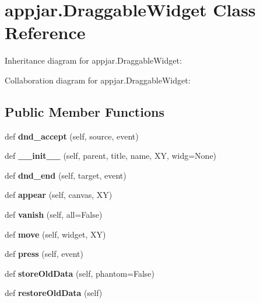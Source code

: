 \hypertarget{classappjar_1_1_draggable_widget}{}\section{appjar.\+Draggable\+Widget Class Reference}
\label{classappjar_1_1_draggable_widget}


Inheritance diagram for appjar.\+Draggable\+Widget\+:


Collaboration diagram for appjar.\+Draggable\+Widget\+:
\subsection*{Public Member Functions}
\begin{DoxyCompactItemize}
\item 
\mbox{\label{classappjar_1_1_draggable_widget_a07c4295f08ad9fbfcecf73a1ef39d99f}} 
def {\bfseries dnd\+\_\+accept} (self, source, event)
\item 
\mbox{\label{classappjar_1_1_draggable_widget_abc8b85a44fb6890ae6ef002eb5480371}} 
def {\bfseries \+\_\+\+\_\+init\+\_\+\+\_\+} (self, parent, title, name, XY, widg=None)
\item 
\mbox{\label{classappjar_1_1_draggable_widget_ae9601af290ccd53679f5f451948b68f1}} 
def {\bfseries dnd\+\_\+end} (self, target, event)
\item 
\mbox{\label{classappjar_1_1_draggable_widget_a1f780bb2acfe3a9c627e4f23e3e63f8d}} 
def {\bfseries appear} (self, canvas, XY)
\item 
\mbox{\label{classappjar_1_1_draggable_widget_abc06632116afbf79ac31a115f1d5090e}} 
def {\bfseries vanish} (self, all=False)
\item 
\mbox{\label{classappjar_1_1_draggable_widget_a6afed12b6001aa17a34964c0ce53cc30}} 
def {\bfseries move} (self, widget, XY)
\item 
\mbox{\label{classappjar_1_1_draggable_widget_ad74407177cd72c92037c3f28a113c62e}} 
def {\bfseries press} (self, event)
\item 
\mbox{\label{classappjar_1_1_draggable_widget_a67accebc9e689e3bf2c20900f54d4e22}} 
def {\bfseries store\+Old\+Data} (self, phantom=False)
\item 
\mbox{\label{classappjar_1_1_draggable_widget_a3d28e9e221493f731439281cdb3b3feb}} 
def {\bfseries restore\+Old\+Data} (self)
\end{DoxyCompactItemize}
